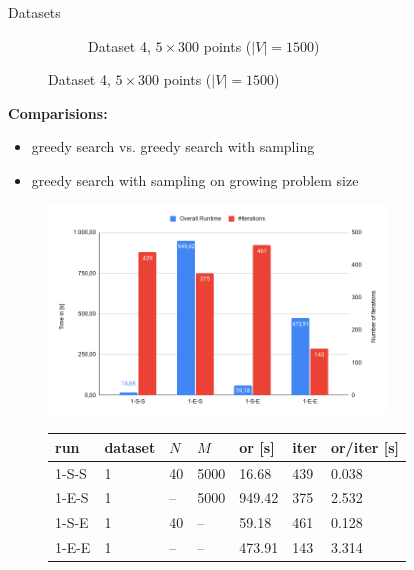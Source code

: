 \documentclass[10pt]{beamer}
\begin{document}
\begin{frame}{Datasets}
\begin{figure}
\begin{subfigure}{0.23\textwidth}
            \caption{Dataset 4, $5 \times 300$ points ($|V|=1500$)}
        \end{subfigure}
    \end{figure}
    \textbf{Comparisions:}
    \begin{itemize}
        \item greedy search vs. greedy search with sampling 
        \item greedy search with sampling on growing problem size
    \end{itemize}
\end{frame}

\begin{frame}
    \begin{figure}
        \includegraphics[width=0.8\textwidth]{pics/chart1.png}
    \end{figure}
    \begin{figure}
        \begin{tabular}{l|lll|lll}
            run & dataset & $N$ & $M$ & {\bf or} [s] & {\bf iter} & {\bf or}/{\bf iter} [s] \\
            \hline 
            1-S-S  & 1 & 40 &  5000       & 16.68 & 439 & 0.038      \\   
            1-E-S  & 1 & -- &  5000       & 949.42 & 375 & 2.532     \\   
            1-S-E  & 1 & 40 &  --         & 59.18 & 461 & 0.128      \\   
            1-E-E  & 1 & -- &  --         & 473.91 & 143 & 3.314     \\
        \end{tabular}
    \end{figure}
\end{frame}
\end{document}
